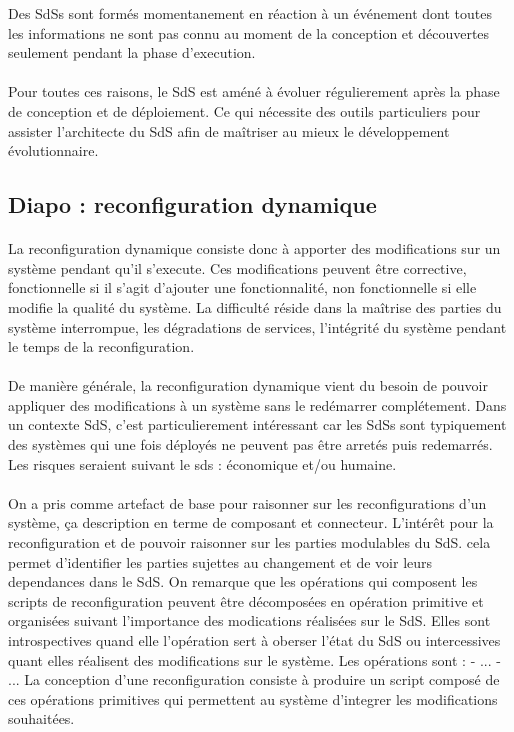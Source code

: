 Des SdSs sont formés momentanement en réaction à un événement dont
toutes les informations ne sont pas connu au moment de la conception
et découvertes seulement pendant la phase d'execution.    


\paragraph{}
Pour toutes ces raisons, le SdS est améné à évoluer régulierement
après la phase de conception et de déploiement. Ce qui nécessite des
outils particuliers pour assister l'architecte du SdS afin de maîtriser au
mieux le développement évolutionnaire. 
  
\subsection{Diapo : reconfiguration dynamique}

\paragraph{}
La reconfiguration dynamique consiste donc à apporter des
modifications sur un système pendant qu'il s'execute. Ces
modifications peuvent être corrective, fonctionnelle si il s'agit
d'ajouter une fonctionnalité, non fonctionnelle si elle modifie la
qualité du système.  La difficulté réside dans la maîtrise des parties
du système interrompue, les dégradations de services, l'intégrité du
système pendant le temps de la reconfiguration. 

\paragraph{}
De manière générale, la reconfiguration dynamique vient du besoin de
pouvoir appliquer des modifications à un système sans le redémarrer
complétement. Dans un contexte SdS, c'est particulierement intéressant
car les SdSs sont typiquement des systèmes qui une fois déployés ne
peuvent pas être arretés puis redemarrés. Les risques seraient suivant
le sds : économique et/ou humaine. 

\paragraph{} 
%
On a pris comme artefact de base pour raisonner sur les reconfigurations
d'un système, ça description en terme de composant et connecteur.
L'intérêt pour la reconfiguration et de pouvoir raisonner sur les
parties modulables du SdS.  cela permet d'identifier les parties
sujettes au changement et de voir leurs dependances dans le SdS.
%
On remarque que les opérations qui composent les scripts de
reconfiguration peuvent être décomposées en opération primitive et
organisées suivant l'importance des modications réalisées sur le SdS. 
Elles sont introspectives quand elle l'opération sert à oberser l'état
du SdS ou intercessives quant elles réalisent des modifications sur le
système. Les opérations sont : 
- ... 
- ...
%
La conception d'une reconfiguration consiste à produire un script
composé de ces opérations primitives qui permettent au système
d'integrer les modifications souhaitées. 


